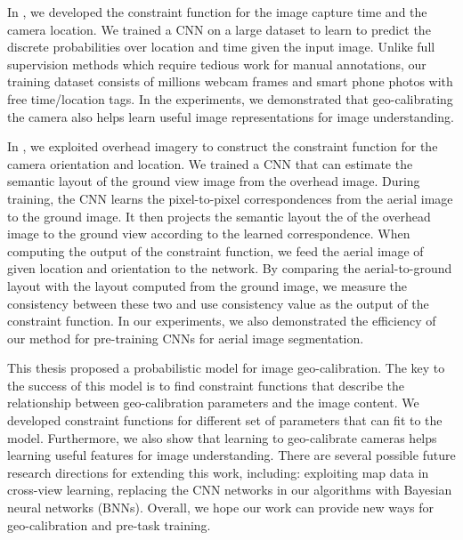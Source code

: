 In , we developed the constraint function for 
the image capture time and the camera location. 
We trained a CNN on a large dataset to learn to predict the discrete
probabilities over location and time given the input image.
Unlike full supervision methods which require tedious work for manual
annotations, our training dataset consists of millions webcam
frames and smart phone photos with free time/location tags.
In the experiments, we demonstrated that geo-calibrating the camera
also helps learn useful image representations for image understanding.

In , we exploited overhead imagery to construct
the constraint function for the camera orientation and location.
We trained a CNN that can estimate the semantic layout of the ground
view image from the overhead image. During training, the CNN learns the
pixel-to-pixel correspondences from the aerial image to the ground
image. 
It then projects the semantic layout the of the overhead image to the
ground view according to the learned correspondence.
When computing the output of the constraint function, we feed the
aerial image of given location and orientation to the network. By
comparing the aerial-to-ground layout with the layout computed from
the ground image, we measure the consistency between these two and use
consistency value as the output of the constraint function. 
In our experiments, we also demonstrated the efficiency of our method
for pre-training CNNs for aerial image segmentation.

This thesis proposed a probabilistic model for image geo-calibration.
The key to the success of this model is to find constraint functions
that describe the relationship between geo-calibration parameters and
the image content. We developed constraint functions for different set
of parameters that can fit to the model.  Furthermore, we also show
that learning to geo-calibrate cameras helps learning useful features
for image understanding.  There are several possible future research
directions for extending this work, including: exploiting map data in
cross-view learning, replacing the CNN networks in our algorithms with
Bayesian neural networks (BNNs).  Overall, we hope our work can
provide new ways for geo-calibration and pre-task training.
